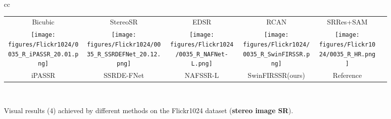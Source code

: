 \documentclass[10pt,twocolumn,letterpaper]{article}
\begin{document}
\begin{figure*}[t]
\begin{tabular}{cc}
\begin{adjustbox}{valign=t}
\begin{tabular}{cccccc}
				Bicubic \hspace{-3mm} &
				StereoSR \hspace{-3mm} &
				EDSR \hspace{-3mm} &
				RCAN \hspace{-3mm} &
				SRRes+SAM \hspace{-3mm}
				\\
				
				\texttt{[image: figures/Flickr1024/0035\_R\_iPASSR\_20.01.png]} \hspace{-3mm} &
				\texttt{[image: figures/Flickr1024/0035\_R\_SSRDEFNet\_20.12.png]} \hspace{-3mm} &
				\texttt{[image: figures/Flickr1024/0035\_R\_NAFNet-L.png]} \hspace{-3mm}   &
				\texttt{[image: figures/Flickr1024/0035\_R\_SwinFIRSSR.png]} \hspace{-3mm} &
				\texttt{[image: figures/Flickr1024/0035\_R\_HR.png]} \hspace{-3mm} 
				\\ 
				
				iPASSR \hspace{-3mm} &
				SSRDE-FNet  \hspace{-3mm} &
				NAFSSR-L \hspace{-3mm} &
				SwinFIRSSR(ours) \hspace{-3mm} &
				Reference \hspace{-3mm}
				\\
			\end{tabular}
		\end{adjustbox}
		\vspace{1mm}
		\\
	\end{tabular}
	\vspace{-3mm}
	\caption{Visual results (4) achieved by different methods on the Flickr1024 dataset (\textbf{stereo image SR}). 
	}
	\label{fig:flickr1024}
	\vspace{-3mm}
\end{figure*} \begin{table*}[!t]
	\centering



\end{table*}
\end{document}
